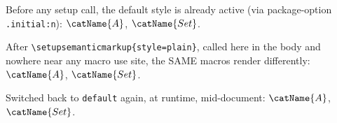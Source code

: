 \documentclass{article}
\begin{document}
Before any setup call, the default style is already active (via
package-option \texttt{.initial:n}): $\catName{A}$, $\catName{Set}$.


After \texttt{\textbackslash setupsemanticmarkup\{style=plain\}}, called
here in the body and nowhere near any macro use site, the SAME macros
render differently: $\catName{A}$, $\catName{Set}$.


Switched back to \texttt{default} again, at runtime, mid-document:
$\catName{A}$, $\catName{Set}$.
\end{document}
